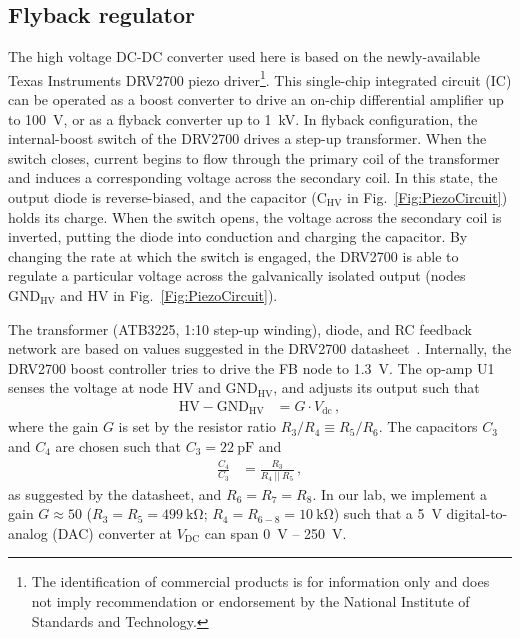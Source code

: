 \documentclass[aip,rsi,reprint]{revtex4-1} %
\begin{document}
\subsection{Flyback regulator}
\label{Sec:DRV2700}

The high voltage DC-DC converter used here is based on the newly-available Texas Instruments DRV2700 piezo driver\footnote{The identification of commercial products is for information only and does not imply recommendation or endorsement by the National Institute of Standards and Technology.}.
This single-chip integrated circuit (IC) can be operated as a boost converter to drive an on-chip differential amplifier up to \SI{100}{\volt}, or as a flyback converter up to \SI{1}{\kilo\volt}.
In flyback configuration, the internal-boost switch of the DRV2700 drives a step-up transformer.
When the switch closes, current begins to flow through the primary coil of the transformer and induces a corresponding voltage across the secondary coil.
In this state, the output diode is reverse-biased, and the capacitor ($\text{C}_{\text{HV}}$ in Fig.~\ref{Fig:PiezoCircuit}) holds its charge.
When the switch opens, the voltage across the secondary coil is inverted, putting the diode into conduction and charging the capacitor.
By changing the rate at which the switch is engaged, the DRV2700 is able to regulate a particular voltage across the galvanically isolated output (nodes $\text{GND}_\text{HV}$ and HV in Fig.~\ref{Fig:PiezoCircuit}).

The transformer (ATB3225, 1:10 step-up winding), diode, and RC feedback network are based on values suggested in the DRV2700 datasheet~\cite{DRV2700Datasheet,DRV2700EVMUserGuide}.
Internally, the DRV2700 boost controller tries to drive the FB node to \SI{1.3}{\volt}.
The op-amp U1 senses the voltage at node HV and $\text{GND}_\text{HV}$, and adjusts its output such that
\begin{align}
\label{Eq:U1Output}
\text{HV} - \text{GND}_{\text{HV}} &= G\cdot V_{\text{dc}}\,,
\end{align}
where the gain $G$ is set by the resistor ratio $R_3/R_4 \equiv R_5/R_6$.
The capacitors $C_3$ and $C_4$ are chosen such that $C_3 = \SI{22}{\pico\farad}$ and 
\begin{align}
\frac{C_4}{C_3} &= \frac{R_3}{R_4~||~R_5}\,,
\end{align}
as suggested by the datasheet, and $R_6 = R_7 = R_8$.
In our lab, we implement a gain $G\approx 50$ ($R_3 = R_5 = \SI{499}{\kilo\ohm}$; $R_4 = R_{6-8} = \SI{10}{\kilo\ohm}$) such that a \SI{5}{\volt} digital-to-analog (DAC) converter at $V_\text{DC}$ can span \SI{0}{\volt} -- \SI{250}{\volt}.
\end{document}
